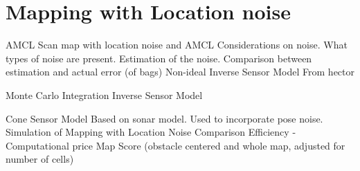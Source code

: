 \section{Mapping with Location noise}
AMCL
Scan map with location noise and AMCL
Considerations on noise. What types of noise are present. Estimation of the noise. Comparison between estimation and actual error (of bags) 
Non-ideal Inverse Sensor Model
From hector

Monte Carlo Integration Inverse Sensor Model 

Cone Sensor Model
Based on sonar model. Used to incorporate pose noise. 
Simulation of Mapping with Location Noise
Comparison
Efficiency - Computational price
Map Score (obstacle centered and whole map, adjusted for number of cells)

